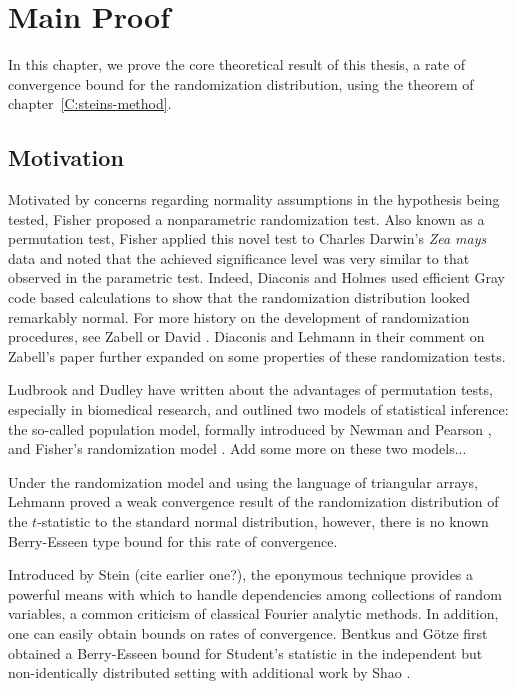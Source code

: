 \chapter{Main Proof}
\label{C:stein-proof}
In this chapter, we prove the core theoretical result of this thesis, a rate of convergence bound for
the randomization distribution, using the theorem of chapter~\ref{C:steins-method}.

\section{Motivation}
Motivated by concerns regarding normality assumptions in the hypothesis being tested, Fisher
\cite{fisher1935design} proposed a nonparametric randomization test.  Also known as a permutation
test, Fisher applied this novel test to Charles Darwin's \emph{Zea mays} data and noted that the
achieved significance level was very similar to that observed in the parametric test.  Indeed,
Diaconis and Holmes \cite{diaconis1994gray} used efficient Gray code based calculations to show that
the randomization distribution looked remarkably normal.  For more history on the development of
randomization procedures, see Zabell \cite{zabell2008student} or David \cite{david2008beginnings}.
Diaconis and Lehmann \cite{diaconis2008comment} in their comment on Zabell's paper further expanded
on some properties of these randomization tests.

Ludbrook and Dudley \cite{ludbrook1998permutation} have written about the advantages of permutation
tests, especially in biomedical research, and outlined two models of statistical inference: the
so-called population model, formally introduced by Newman and Pearson \cite{neyman1928use}, and
Fisher's randomization model \cite{fisher1935design}.  Add some more on these two models...

Under the randomization model and using the language of triangular arrays, Lehmann
\cite{lehmann1999elements} proved a weak convergence result of the randomization distribution of the
$t$-statistic to the standard normal distribution, however, there is no known Berry-Esseen type
bound for this rate of convergence.

Introduced by Stein \cite{stein1986approximate} (cite earlier one?), the eponymous technique
provides a powerful means with which to handle dependencies among collections of random variables, a
common criticism of classical Fourier analytic methods.  In addition, one can easily obtain bounds
on rates of convergence.  Bentkus and G{\"o}tze \cite{bentkus1996berry} first obtained a
Berry-Esseen bound for Student's statistic in the independent but non-identically distributed
setting with additional work by Shao \cite{shao2005explicit}.

